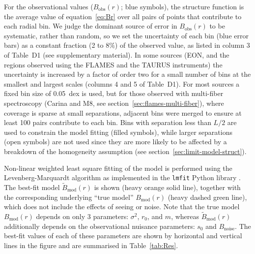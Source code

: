 \documentclass[fleqn,usenatbib, useAMS, a4paper]{mnras}
\newcommand\startNEW{\color{black}}
\newcommand\stopNEW{\color{black}}
\newcommand\noise{\ensuremath{_{\text{noise}}}}
\newcommand\obs{\ensuremath{_{\mathrm{obs}}}}
\newcommand\model{\ensuremath{_{\mathrm{mod}}}}
\begin{document}
For the observational values (\(B\obs(r)\); blue symbols),
the structure function is the average value of equation~\eqref{eq:Br}
over all pairs of points that contribute to each radial bin.
\startNEW
We judge the dominant source of error in \(B\obs(r)\) to be systematic,
rather than random, so we set the uncertainty of each bin (blue error bars)
as a constant fraction (2 to 8\%) of the observed value,
as listed in column 3 of Table~D1 (see supplementary material).
In some sources
(EON, and the regions observed using the FLAMES and the TAURUS instruments)
the uncertainty is increased by a factor of order two for a small number of bins
at the smallest and largest scales (columns 4 and 5 of Table~D1).
\stopNEW
For most sources a fixed bin size of \SI{0.05}{dex} is used,
but for those observed with multi-fiber spectroscopy
(Carina and M8, see section~\ref{sec:flames-multi-fiber}),
where coverage is sparse at small separations,
adjacent bins were merged to ensure at least 100 pairs contribute to each bin.
Bins with separation less than \(L/2\) are used to constrain the model fitting (filled symbols),
while larger separations (open symbols) are not used
since they are more likely to be affected by a breakdown
of the homogeneity assumption (see section~\ref{sec:limit-model-struct}).

Non-linear weighted least square fitting of the model is performed
using the Levenberg-Marquardt algorithm \citep{More:1978a} as implemented in the
\texttt{lmfit} Python library \citep{newville_matthew_2014_11813}.
The best-fit model \(\tilde{B}\model(r)\) is shown (heavy orange solid line),
together with the corresponding underlying ``true model'' \(B\model(r)\) (heavy dashed green line),
which does not include the effects of seeing or noise.
Note that the true model \(B\model(r)\) depends on only 3 parameters:
\(\sigma^2\), \(r_0\), and \(m\),
whereas \(\tilde{B}\model(r)\) additionally depends on
the observational nuisance parameters: \(s_0\) and \(B\noise\).
The best-fit values of each of these parameters are shown by
horizontal and vertical lines in the figure and are summarised in Table~\ref{tab:Res}.
\end{document}
